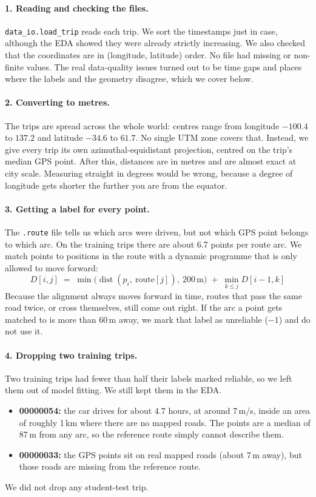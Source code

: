\documentclass[11pt,a4paper]{article}
\newcommand{\code}[1]{\texttt{\small #1}}
\begin{document}
\paragraph{1. Reading and checking the files.}
\code{data\_io.load\_trip} reads each trip. We sort the timestamps just in case, although the EDA showed they
were already strictly increasing. We also checked that the coordinates are in (longitude, latitude) order. No
file had missing or non-finite values. The real data-quality issues turned out to be time gaps and places where
the labels and the geometry disagree, which we cover below.

\paragraph{2. Converting to metres.}
The trips are spread across the whole world: centres range from longitude $-100.4$ to $137.2$ and latitude
$-34.6$ to $61.7$. No single UTM zone covers that. Instead, we give every trip its own azimuthal-equidistant
projection, centred on the trip's median GPS point. After this, distances are in metres and are almost exact
at city scale. Measuring straight in degrees would be wrong, because a degree of longitude gets shorter the
further you are from the equator.

\paragraph{3. Getting a label for every point.}
The \code{.route} file tells us which arcs were driven, but not which GPS point belongs to which arc. On the
training trips there are about 6.7 points per route arc. We match points to positions in the route with a
dynamic programme that is only allowed to move forward:
\[
D[i,j] \;=\; \min\!\big(\operatorname{dist}(p_i,\ \text{route}[j]),\ 200\,\text{m}\big) \;+\; \min_{k \le j} D[i-1,k]
\]
Because the alignment always moves forward in time, routes that pass the same road twice, or cross
themselves, still come out right. If the arc a point gets matched to is more than 60\,m away, we mark that
label as unreliable ($-1$) and do not use it.

\paragraph{4. Dropping two training trips.}
Two training trips had fewer than half their labels marked reliable, so we left them out of model fitting.
We still kept them in the EDA.
\begin{itemize}
  \item \textbf{00000054:} the car drives for about 4.7 hours, at around 7\,m/s, inside an area of roughly
        1\,km where there are no mapped roads. The points are a median of 87\,m from any arc, so the
        reference route simply cannot describe them.
  \item \textbf{00000033:} the GPS points sit on real mapped roads (about 7\,m away), but those roads are
        missing from the reference route.
\end{itemize}
We did not drop any student-test trip.
\end{document}
